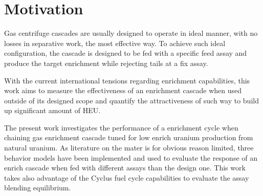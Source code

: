 \section{Motivation}

Gas centrifuge cascades are usually designed to operate in ideal manner, with no
losses in separative work, the most effective way. To achieve such ideal
configuration, the cascade is designed to be fed with a specific feed assay and
produce the target  enrichment while rejecting tails at a fix assay.

With the current international tensions regarding enrichment capabilities, this
work aims to measure the effectiveness of an enrichment cascade when used outside of
its designed scope and quantify the attractiveness of such way to build up
significant amount of \gls{HEU}.

The present work investigates the performance of a enrichment cycle when chaining
gas enrichment cascade tuned for low enrich uranium production from natural
uranium. As literature on the mater is for obvious reason limited, three
behavior models have been implemented and used to evaluate the response of an
enrich cascade when fed with different assays than the design one. This work
takes also advantage of the Cyclus\cite{cyclus} fuel cycle capabilities to
evaluate the assay blending equilibrium.

